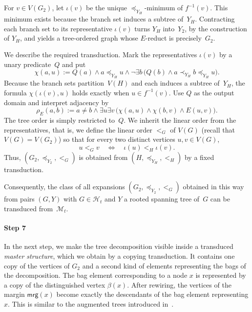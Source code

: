 \documentclass[1p,number,11pt]{elsarticle}
\theoremstyle{plain}
\newcommand{\mrg}{\mathsf{mrg}}
\begin{document}
For $v\in V(G_2)$, let $\iota(v)$ be the unique $\preceq_{Y_H}$-minimum of $f^{-1}(v)$.
This minimum exists because the branch set induces a subtree of~$Y_H$.
Contracting each branch set to its representative $\iota(v)$ turns $Y_H$ into~$Y_2$, by the construction of $Y_H$, and yields a tree-ordered graph whose $E$-reduct is precisely~$G_2$.

We describe the required transduction.
Mark the representatives $\iota(v)$ by a unary predicate~$Q$ and put
\[
 \chi(a,u):=Q(a)\wedge a\preceq_{Y_H}u
 \wedge\neg\exists b\,
 \bigl(Q(b)\wedge a\prec_{Y_H}b\preceq_{Y_H}u\bigr).
\]
Because the branch sets partition~$V(H)$ and each induces a subtree of~$Y_H$, the formula $\chi(\iota(v),u)$ holds exactly when $u\in f^{-1}(v)$.
Use $Q$ as the output domain and interpret adjacency by
\[
 \rho_E(a,b):=a\neq b\wedge
 \exists u\exists v\,
 \bigl(\chi(a,u)\wedge\chi(b,v)\wedge E(u,v)\bigr).
\]
The tree order is simply restricted to~$Q$.
We inherit the linear order from the representatives, that is, we define the linear order $<_{G}$ of $V(G)$ (recall that $V(G)=V(G_2)$) so that for every two distinct vertices $u,v\in V(G)$,
\[
   u <_{G} v
   \quad\Longleftrightarrow\quad
   \iota(u)<_H\iota(v).
\]
Thus, $(G_2,\preceq_{Y_2},<_{G})$ is obtained from $(H,\preceq_{Y_H},<_H)$ by a fixed transduction.

Consequently, the class of all expansions $(G_2,\preceq_{Y_2},<_{G})$ obtained in this
way from pairs $(G,Y)$ with $G\in\mathscr H_t$ and $Y$ a rooted spanning
tree of~$G$ can be transduced from~$\mathscr M_t$.

\paragraph{Step 7}

In the next step, we make the tree decomposition visible inside a transduced \emph{master structure}, which we obtain by a copying transduction.  
It contains one copy of the vertices of $G_2$ and a second kind of elements representing the bags of the decomposition. 
The bag element corresponding to a node $x$ is represented by a copy of the distinguished vertex $\beta(x)$. 
After rewiring, the vertices of the margin $\mrg(x)$ become exactly the descendants of the bag element representing $x$. 
This is similar to the augmented trees introduced in~\cite{pillipczuk2021connectivity}. 
\end{document}
